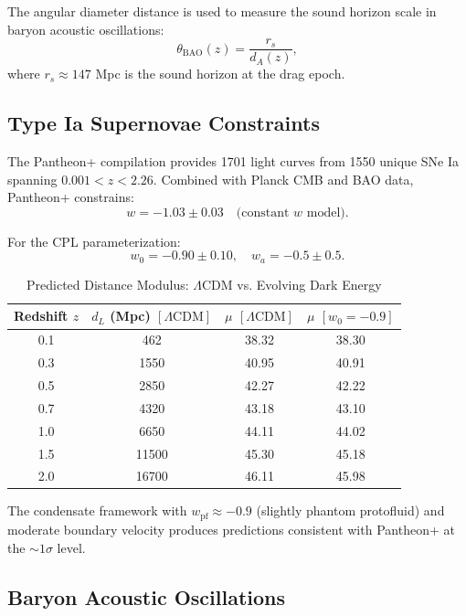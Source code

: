 \documentclass[11pt,a4paper]{article}
\newcommand{\wpf}{\ensuremath{w_{\mathrm{pf}}}}
\theoremstyle{definition}
\theoremstyle{remark}
\begin{document}
The angular diameter distance is used to measure the sound horizon scale in baryon acoustic oscillations:
\begin{equation}
\theta_{\mathrm{BAO}}(z) = \frac{r_s}{d_A(z)},
\end{equation}
where $r_s \approx 147$ Mpc is the sound horizon at the drag epoch.

\subsection{Type Ia Supernovae Constraints}
\label{sec:SNIa}

The Pantheon+ compilation \cite{Scolnic2022} provides 1701 light curves from 1550 unique SNe Ia spanning $0.001 < z < 2.26$. Combined with Planck CMB and BAO data, Pantheon+ constrains:
\begin{equation}
w = -1.03 \pm 0.03 \quad \text{(constant } w \text{ model)}.
\end{equation}

For the CPL parameterization:
\begin{equation}
w_0 = -0.90 \pm 0.10, \quad w_a = -0.5 \pm 0.5.
\end{equation}

\begin{table}[H]
\centering
\caption{Predicted Distance Modulus: $\Lambda$CDM vs. Evolving Dark Energy}
\label{tab:distance_modulus}
\begin{tabular}{@{}cccc@{}}
\toprule
Redshift $z$ & $d_L$ (Mpc) $[\Lambda\text{CDM}]$ & $\mu$ $[\Lambda\text{CDM}]$ & $\mu$ $[w_0=-0.9]$ \\
\midrule
0.1 & 462 & 38.32 & 38.30 \\
0.3 & 1550 & 40.95 & 40.91 \\
0.5 & 2850 & 42.27 & 42.22 \\
0.7 & 4320 & 43.18 & 43.10 \\
1.0 & 6650 & 44.11 & 44.02 \\
1.5 & 11500 & 45.30 & 45.18 \\
2.0 & 16700 & 46.11 & 45.98 \\
\bottomrule
\end{tabular}
\end{table}

The condensate framework with $\wpf \approx -0.9$ (slightly phantom protofluid) and moderate boundary velocity produces predictions consistent with Pantheon+ at the $\sim 1\sigma$ level.

\subsection{Baryon Acoustic Oscillations}
\label{sec:BAO}
\end{document}

